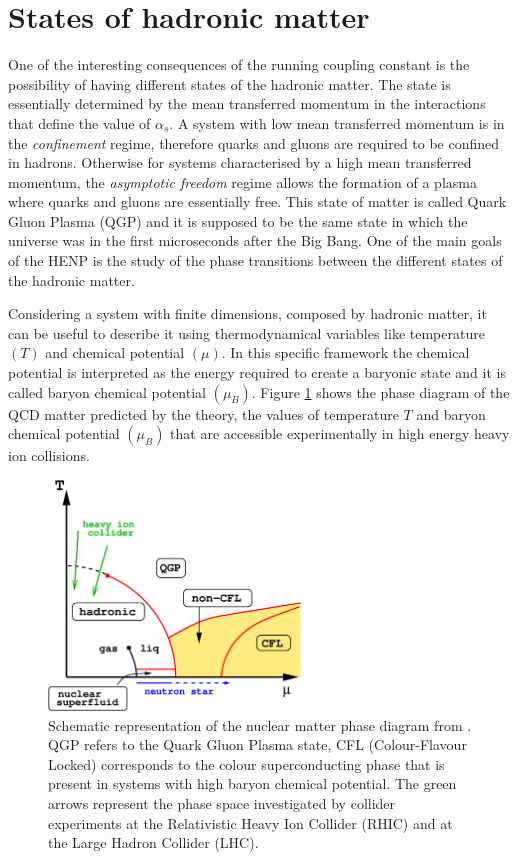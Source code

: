 %
%
\section{States of hadronic matter}
\label{sec:1.2}

One of the interesting consequences of the running coupling constant is the possibility of having
different states of the hadronic matter. The state is essentially determined by the mean transferred 
momentum in the interactions that define the value of $\alpha_{s}$. 
A system with low mean transferred momentum is in the \textit{confinement} regime, therefore quarks
and gluons are required to be confined in hadrons. Otherwise for systems characterised by a high mean
transferred momentum, the \textit{asymptotic freedom} regime allows the formation of a plasma where
quarks and gluons are essentially free.
This state of matter is called Quark Gluon Plasma (QGP) and it is supposed to be the same state in
which the universe was in the first microseconds after the Big Bang.
One of the main goals of the HENP is the study of the phase transitions between the different
states of the hadronic matter.

Considering a system with finite dimensions, composed by hadronic matter, it can be useful to describe it 
using thermodynamical variables like temperature $(T)$ and chemical potential $(\mu)$. In this
specific framework the chemical potential is interpreted as the energy required to create a 
baryonic state and it is called baryon chemical potential $(\mu_{B})$. 
Figure \ref{fig:qgpdiagram} shows the phase diagram of the QCD matter predicted by the theory, 
the values of temperature $T$ and baryon chemical potential $(\mu_{B})$ that are accessible
experimentally in high energy heavy ion collisions.

\begin{figure}
    \centering
    \includegraphics[width=0.6\textwidth]{gfx/qgpphase}
	\caption{Schematic representation of the nuclear matter phase diagram from \cite{qgpphase}. QGP refers to the Quark Gluon Plasma state, CFL (Colour-Flavour Locked) corresponds to the colour superconducting phase that is present in systems with high baryon chemical potential. The green arrows represent the phase space investigated by collider experiments at the Relativistic Heavy Ion Collider (RHIC) and at the Large Hadron Collider (LHC).}
	\label{fig:qgpdiagram}
\end{figure}

